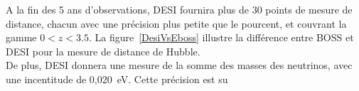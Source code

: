 \message{ !name(doc.tex)}\documentclass[11pt, twoside, a4paper, openright]{report}
\begin{document}
A la fin des 5 ans d'observations, DESI fournira plus de 30 points de mesure de distance, chacun avec une précision plus petite que le pourcent, et couvrant la gamme $0 < z < 3.5$. La figure~\ref{DesiVsEboss} illustre la différence entre BOSS et DESI pour la mesure de distance de Hubble.\\
De plus, DESI donnera une mesure de la somme des masses des neutrinos, avec une incentitude de 0,020~eV. Cette précision est su
\end{document}
